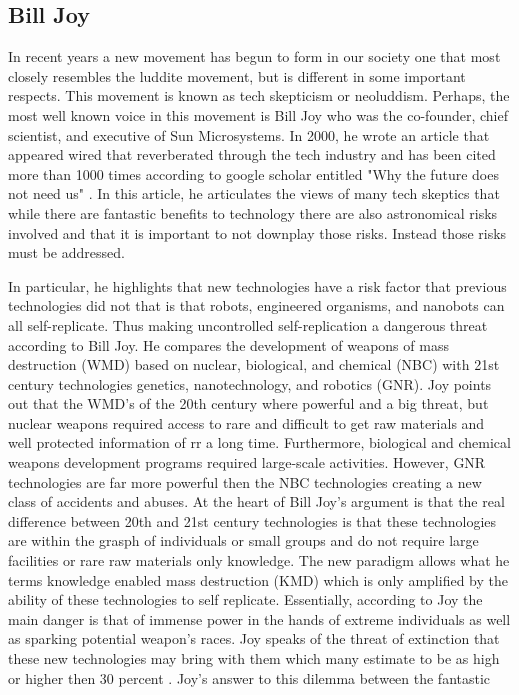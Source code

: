\subsection{Bill Joy}
  In recent years a new movement has begun to form in our society one that most closely resembles the luddite movement, but is different in some important respects. This movement is known as tech skepticism or neoluddism. Perhaps, the most well known voice in this movement is Bill Joy who was the co-founder, chief scientist, and executive of Sun Microsystems. In 2000, he wrote an article that appeared wired that reverberated through the tech industry and has been cited more than 1000 times according to google scholar entitled "Why the future does not need us" \cite{joy2000future}. In this article, he articulates the views of many tech skeptics that while there are fantastic benefits to technology there are also astronomical risks involved and that it is important to not downplay those risks. Instead those risks must be addressed. \par In particular, he highlights that new technologies have a risk factor that previous technologies did not that is that robots, engineered organisms, and nanobots can all self-replicate. Thus making uncontrolled self-replication a dangerous threat according to Bill Joy. He compares the development of weapons of mass destruction (WMD) based on nuclear, biological, and chemical (NBC) with 21st century technologies genetics, nanotechnology, and robotics (GNR). Joy points out that the WMD's of the 20th century where powerful and a big threat, but nuclear weapons required access to rare and difficult to get raw materials and well protected information of rr a long time. Furthermore, biological and chemical weapons development programs required large-scale activities. However, GNR technologies are far more powerful then the NBC technologies creating a new class of accidents and abuses. At the heart of Bill Joy's argument is that the real difference between 20th and 21st century technologies is that these technologies are within the grasph of individuals or small groups and do not require large facilities or rare raw materials only knowledge. The new paradigm allows what he terms knowledge enabled mass destruction (KMD) which is only amplified by the ability of these technologies to self replicate. Essentially, according to Joy the main danger is that of immense power in the hands of extreme individuals as well as sparking potential weapon's races. Joy speaks of the threat of extinction that these new technologies may bring with them which many estimate to be as high or higher then 30 percent \cite{joy2000future}. Joy's answer to this dilemma between the fantastic 
